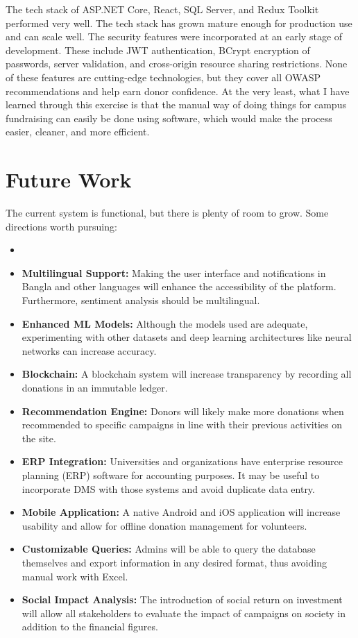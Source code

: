 \documentclass{thesis-library}
\begin{document}
The tech stack of ASP.NET Core, React, SQL Server, and Redux Toolkit performed very well. The tech stack has grown mature enough for production use and can scale well. The security features were incorporated at an early stage of development. These include JWT authentication, BCrypt encryption of passwords, server validation, and cross-origin resource sharing restrictions. None of these features are cutting-edge technologies, but they cover all OWASP recommendations and help earn donor confidence.
At the very least, what I have learned through this exercise is that the manual way of doing things for campus fundraising can easily be done using software, which would make the process easier, cleaner, and more efficient.

\section{Future Work}

The current system is functional, but there is plenty of room to grow. Some directions worth pursuing:

\begin{itemize}
    \item \item \textbf{Multilingual Support:} Making the user interface and notifications in Bangla and other languages will enhance the accessibility of the platform. Furthermore, sentiment analysis should be multilingual.
    \item \textbf{Enhanced ML Models:} Although the models used are adequate, experimenting with other datasets and deep learning architectures like neural networks can increase accuracy.
    \item \textbf{Blockchain:} A blockchain system will increase transparency by recording all donations in an immutable ledger.
    \item \textbf{Recommendation Engine:} Donors will likely make more donations when recommended to specific campaigns in line with their previous activities on the site.
    \item \textbf{ERP Integration:} Universities and organizations have enterprise resource planning (ERP) software for accounting purposes. It may be useful to incorporate DMS with those systems and avoid duplicate data entry.
    \item \textbf{Mobile Application:} A native Android and iOS application will increase usability and allow for offline donation management for volunteers.
    \item \textbf{Customizable Queries:} Admins will be able to query the database themselves and export information in any desired format, thus avoiding manual work with Excel.
    \item \textbf{Social Impact Analysis:} The introduction of social return on investment will allow all stakeholders to evaluate the impact of campaigns on society in addition to the financial figures.
\end{itemize}
\end{document}
